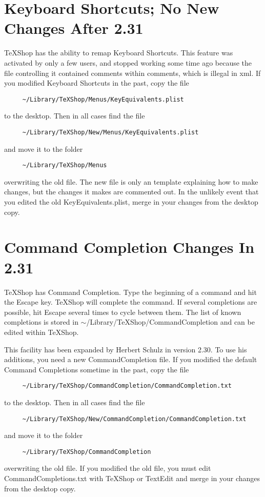 \documentclass[11pt, oneside]{amsart}
\begin{document}
\section{Keyboard Shortcuts; No New Changes After 2.31}

TeXShop has the ability to remap Keyboard Shortcuts. This feature was activated by only a few users, and stopped working some time ago because the file controlling it contained comments within comments, which is illegal in xml. If you modified Keyboard Shortcuts in the past, copy the file
\begin{verbatim}
     ~/Library/TeXShop/Menus/KeyEquivalents.plist
\end{verbatim}
 to  the desktop. Then in all cases find the file
\begin{verbatim}
     ~/Library/TeXShop/New/Menus/KeyEquivalents.plist
\end{verbatim}
and move it to the folder
\begin{verbatim}
     ~/Library/TeXShop/Menus
\end{verbatim}
overwriting the old file. The new file is only an template explaining how to make changes, but the changes it makes are commented out. In the unlikely event that you edited the old KeyEquivalents.plist, merge in your changes from the desktop copy.


\section{Command Completion Changes In 2.31}

TeXShop has Command Completion. Type the beginning of a command and hit the Escape key. TeXShop will complete the command. If several completions are possible, hit Escape several times to cycle between them.
The list of known completions is stored in $\sim$/Library/TeXShop/CommandCompletion and  can be edited within TeXShop.

This facility has been expanded by Herbert Schulz in version 2.30. To use his additions, you need a new CommandCompletion file. 
If you modified the default Command Completions sometime in the past, copy the file 
\begin{verbatim}
     ~/Library/TeXShop/CommandCompletion/CommandCompletion.txt 
\end{verbatim}
 to  the desktop. Then in all cases find the file
 \begin{verbatim}
     ~/Library/TeXShop/New/CommandCompletion/CommandCompletion.txt 
\end{verbatim}
and move it to the folder  
\begin{verbatim}
     ~/Library/TeXShop/CommandCompletion 
\end{verbatim}
overwriting the old file.  If you modified the old file, you must edit CommandCompletions.txt with TeXShop or TextEdit and merge in your changes from the desktop copy.
\end{document}
